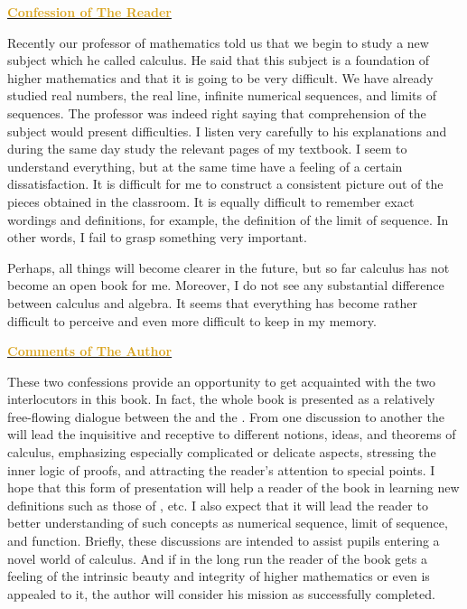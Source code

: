\vspace{2mm}

\begin{center}
\bfseries \underline{\textcolor{Goldenrod}{Confession of The Reader}}
\end{center}

\hspace{5mm}\textcolor{shadow}{Recently our professor of mathematics told us that we begin to study a new subject which he called calculus. He said that this subject is a foundation of higher mathematics and that it is going to be very difficult. We have already studied real numbers, the real line, infinite numerical sequences, and limits of sequences. The professor was indeed right saying that comprehension of the subject would present difficulties. I listen very carefully to his explanations and during the same day study the relevant pages of my textbook. I seem to understand everything, but at the same time have a feeling of a certain dissatisfaction. It is difficult for me to construct a consistent picture out of the pieces obtained in the classroom. It is equally difficult to remember exact wordings and definitions, for example, the definition of the limit of sequence. In other words, I fail to grasp something very important.}

\hspace{5mm}\textcolor{shadow}{Perhaps, all things will become clearer in the future, but so far calculus has not become an open book for me. Moreover, I do not see any substantial difference between calculus and algebra. It seems that everything has become rather difficult to perceive and even more difficult to keep in my memory.}

\vspace{2mm}


\begin{center}
\bfseries \underline{\textcolor{Goldenrod}{Comments of The Author}}
\end{center}

\hspace{5mm}\textcolor{shadow}{These two confessions provide an opportunity to get acquainted with the two interlocutors in this book. In fact, the whole book is presented as a relatively free-flowing dialogue between the  and the . From one discussion to another the  will lead the inquisitive and receptive  to different notions, ideas, and theorems of calculus, emphasizing especially complicated or delicate aspects, stressing the inner logic of proofs, and attracting the reader's attention to special points. I hope that this form of presentation will help a reader of the book in learning new definitions such as those of , etc. I also expect that it will lead the reader to better understanding of such concepts as numerical sequence, limit of sequence, and function. Briefly, these discussions are intended to assist pupils entering a novel world of calculus. And if in the long run the reader of the book gets a feeling of the intrinsic beauty and integrity of higher mathematics or even is appealed to it, the author will consider his mission as successfully completed.}

